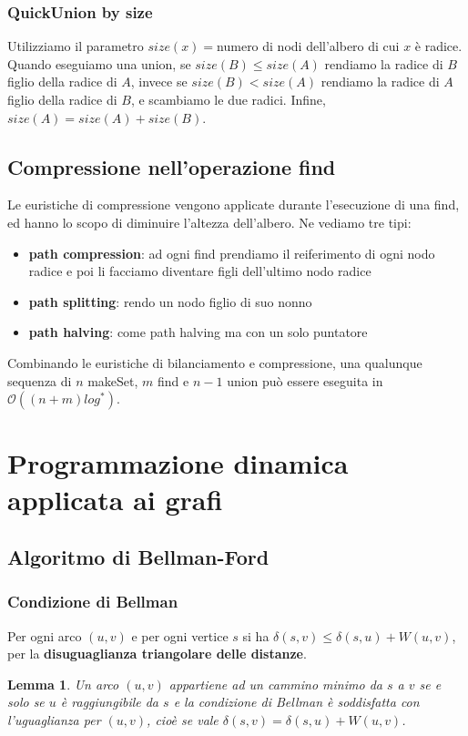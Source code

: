 \documentclass[11pt]{article}
\newtheorem*{lemma}{Lemma}
\begin{document}
\subsubsection{QuickUnion by size}
Utilizziamo il parametro $size(x)=$numero di nodi dell'albero di cui $x$ è radice.
Quando eseguiamo una union, se $size(B)\leq size(A)$ rendiamo la radice di $B$ figlio della radice di $A$, invece se 
$size(B)<size(A)$ rendiamo la radice di $A$ figlio della radice di $B$, e scambiamo le due radici. Infine, $size(A)=size(A)+size(B)$.
\subsection{Compressione nell'operazione find}
Le euristiche di compressione vengono applicate durante l'esecuzione di una find, ed hanno lo scopo di diminuire l'altezza
dell'albero. Ne vediamo tre tipi:
\begin{itemize}
    \item \textbf{path compression}: ad ogni find prendiamo il reiferimento di ogni nodo radice e poi li facciamo diventare 
    figli dell'ultimo nodo radice
    \item \textbf{path splitting}: rendo un nodo figlio di suo nonno
    \item \textbf{path halving}: come path halving ma con un solo puntatore
\end{itemize}
Combinando le euristiche di bilanciamento e compressione, una qualunque sequenza di $n$ makeSet, $m$ find e $n-1$ union 
può essere eseguita in $\mathcal{O}((n+m)log^*)$.
\section{Programmazione dinamica applicata ai grafi}
\subsection{Algoritmo di Bellman-Ford}
\subsubsection{Condizione di Bellman}
Per ogni arco $(u,v)$ e per ogni vertice $s$ si ha $\delta(s,v)\leq \delta(s,u)+W(u,v)$, per la \textbf{disuguaglianza 
triangolare delle distanze}.
\begin{lemma}
    Un arco $(u,v)$ appartiene ad un cammino minimo da $s$ a $v$ se e solo se $u$ è raggiungibile da $s$ e la condizione 
    di Bellman è soddisfatta con l'uguaglianza per $(u,v)$, cioè se vale $\delta(s,v)=\delta(s,u)+W(u,v)$.
\end{lemma}
\end{document}
